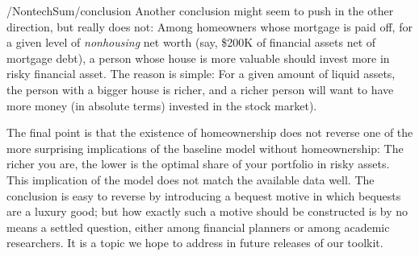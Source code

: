 \documentclass[PortfolioChoiceWithRiskyHousing]{subfiles}
\begin{document}
\begin{verbatimwrite}{\LaTeXOutput/NontechSum/conclusion}
  Another conclusion might seem to push in the other direction, but really does not: Among homeowners whose mortgage is paid off, for a given level of \textit{nonhousing} net worth (say, \$200K of financial assets net of mortgage debt), a person whose house is more valuable should invest more in risky financial asset.  The reason is simple:  For a given amount of liquid assets, the person with a bigger house is richer, and a richer person will want to have more money (in absolute terms) invested in the stock market).

  The final point is that the existence of homeownership does not reverse one of the more surprising implications of the baseline model without homeownership:  The richer you are, the lower is the optimal share of your portfolio in risky assets.  This implication of the model does not match the available data well.  The conclusion is easy to reverse by introducing a bequest motive in which bequests are a luxury good; but how exactly such a motive should be constructed is by no means a settled question, either among financial planners or among academic researchers.  It is a topic we hope to address in future releases of our toolkit.

\end{verbatimwrite}


\clearpage\vfill\eject

\onlyinsubfile{}
\end{document}
